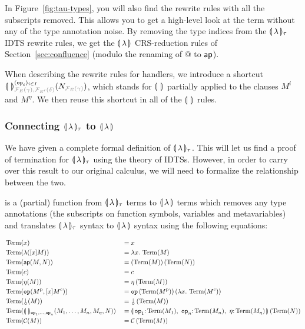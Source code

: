 In Figure~\ref{fig:tau-types}, you will also find the rewrite rules with
all the subscripts removed. This allows you to get a high-level look at the
term without any of the type annotation noise. By removing the type indices
from the $\llparenthesis \, \lambda \, \rrparenthesis_\tau$ IDTS rewrite rules, we get the
$\llparenthesis \, \lambda \, \rrparenthesis$ CRS-reduction rules of Section~\ref{sec:confluence}
(modulo the renaming of $@$ to $\mathsf{ap}$).

When describing the rewrite rules for handlers, we introduce a shortcut
$\banana{}^{(\op{op}_i)_{i \in
    I}}_{\typehint{\FF_E(\gamma),\FF_{E'}(\delta)}}(N_{\typehint{\FF_E(\gamma)}})$,
which stands for $\llparenthesis \,  \, \rrparenthesis$ partially applied to the clauses $M^i$ and
$M^\eta$. We then reuse this shortcut in all of the $\llparenthesis \,  \, \rrparenthesis$ rules.


\subsubsection{Connecting $\llparenthesis \, \lambda \, \rrparenthesis_\tau$ to $\llparenthesis \, \lambda \, \rrparenthesis$}
\label{sssec:connecting-bananas}

We have given a complete formal definition of $\llparenthesis \, \lambda \, \rrparenthesis_\tau$. This
will let us find a proof of termination for $\llparenthesis \, \lambda \, \rrparenthesis_\tau$ using
the theory of IDTSs.  However, in order to carry over this result to our
original calculus, we will need to formalize the relationship between the
two.

\begin{definition}
   is a (partial) function from $\llparenthesis \, \lambda \, \rrparenthesis_\tau$ terms
  to $\llparenthesis \, \lambda \, \rrparenthesis$ terms which removes any type annotations (the
  subscripts on function symbols, variables and metavariables) and
  translates $\llparenthesis \, \lambda \, \rrparenthesis_\tau$ syntax to $\llparenthesis \, \lambda \, \rrparenthesis$ syntax
  using the following equations:
  
  \begin{align*}
    & \Term(x) &&= x \\
    & \Term(\lambda([x] M)) &&= \lam{x}{\Term(M)} \\
    & \Term(\aps(M, N)) &&= \ap{(\Term(M))}{(\Term(N))} \\
    & \Term(c) &&= c \\
    & \Term(\eta(M)) &&= \etaE{(\Term(M))} \\
    & \Term(\op{op}(M^{\mathrm{p}}, [x] M^{\mathrm{c}})) &&= \app{\op{op}}{(\Term(M^{\mathrm{p}}))}{(\lam{x}{\Term(M^{\mathrm{c}})})} \\
    & \Term(\cherry(M)) &&= \ap{\cherry}{(\Term(M))} \\
    & \Term(\banana{}_{\op{op}_1, \ldots, \op{op}_n}(M_1, \ldots, M_n, M_\eta, N)) &&= \ap{\banana{\onto{\op{op}_1}{\Term(M_1)},\ \onto{\op{op}_n}{\Term(M_n)},\ \onto{\eta}{\Term(M_\eta)}}}{(\Term(N))} \\
    & \Term(\CC(M)) &&= \ap{\CC}{(\Term(M))}
  \end{align*}
\end{definition}

